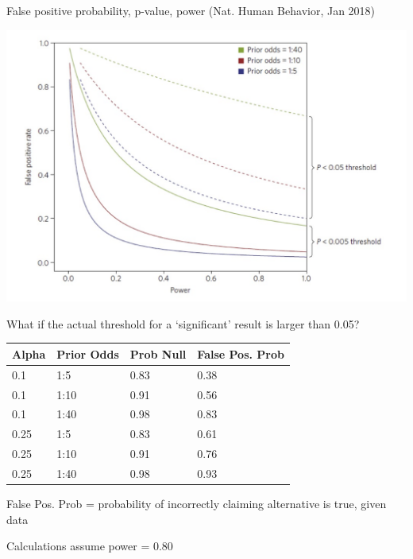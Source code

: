 \documentclass[ignorenonframetext,]{beamer}
\begin{document}
\begin{frame}{False positive probability, p-value, power (Nat. Human
Behavior, Jan 2018)}
\protect\hypertarget{false-positive-probability-p-value-power-nat.-human-behavior-jan-2018}{}

\includegraphics[width=1\textwidth,height=\textheight]{ppv_threshold.jpeg}

\end{frame}

\begin{frame}{What if the actual threshold for a `significant' result is
larger than 0.05?}
\protect\hypertarget{what-if-the-actual-threshold-for-a-significant-result-is-larger-than-0.05}{}

\begin{longtable}[]{@{}llll@{}}
\toprule
Alpha & Prior Odds & Prob Null & False Pos. Prob\tabularnewline
\midrule
\endhead
0.1 & 1:5 & 0.83 & 0.38\tabularnewline
0.1 & 1:10 & 0.91 & 0.56\tabularnewline
0.1 & 1:40 & 0.98 & 0.83\tabularnewline
0.25 & 1:5 & 0.83 & 0.61\tabularnewline
0.25 & 1:10 & 0.91 & 0.76\tabularnewline
0.25 & 1:40 & 0.98 & 0.93\tabularnewline
\bottomrule
\end{longtable}

False Pos. Prob = probability of incorrectly claiming alternative is
true, given data

Calculations assume power = 0.80

\end{frame}
\end{document}
